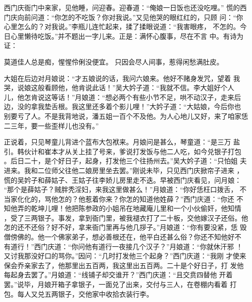 西门庆衙门中来家，见他睡，问迎春。迎春道：“俺娘一日饭也还没吃哩。”
慌的西门庆向前问道：“你怎的不吃饭？你对我说。”又见他哭的眼红红的，只顾
问：“你心里怎么的？对我说。”李瓶儿连忙起来，揉了揉眼说道：“我害眼疼，
不怎的。今日心里懒待吃饭。”并不题出一字儿来。正是：满怀心腹事，尽在不言
中。有诗为证：

莫道佳人总是痴，惺惺伶俐没便宜。
只因会尽人间事，惹得闲愁满肚皮。

大姐在后边对月娘说：“才五娘说的话，我问六娘来。他好不赌身发咒，望着
我哭，说娘这般看顾他，他肯说此话！”吴大妗子道：“我就不信。李大姐好个人
儿，他怎肯说这等话！”月娘道：“想必两个有些小节不足，哄不动汉子，走来后
边，没的拿我垫舌根。我这里还多着个影儿哩！”大妗子道：“大姑娘，今后你也
别要亏了人。不是我背地说，潘五姐一百个不及他。为人心地儿又好，来了咱家恁
二三年，要一些歪样儿也没有。”

正说着，只见琴童儿背进个蓝布大包袱来。月娘问是甚么，琴童道：“是三万
盐引。韩伙计和崔本才从关上挂了号来，爹说打发饭与他二人吃，如今兑银子打包
。后日二十，是个好日子，起身，打发他三个往扬州去。”吴大妗子道：“只怕姐
夫进来。我和二位师父往他二娘房里坐去罢。”刚说未毕，只见西门庆掀帘子进来
，慌的吴妗子和薛姑子、王姑子往李娇儿房里走不迭。早被西门庆看见，问月娘：
“那个是薛姑子？贼胖秃淫妇，来我这里做甚么！”月娘道：“你好恁枉口拨舌，
不当家化化的，骂他怎的？他惹着你来？你怎的知道他姓薛？”西门庆道：“你还
不知他弄的乾坤儿哩！他把陈参政的小姐吊在地藏庵儿里和一个小伙偷奸，他知情
，受了三两银子。事发，拿到衙门里，被我褪衣打了二十板，交他嫁汉子还俗。他
怎的还不还俗？好不好，拿来衙门里再与他几拶子。”月娘道：“你有要没紧，恁
毁僧傍佛的。他一个佛家弟子，想必善根还在，他平白还甚么俗？你还不知他好不
有道行！”西门庆道：“你问他有道行一夜接几个汉子？”月娘道：“你就休汗邪
！又讨我那没好口的骂你。”因问：“几时打发他三个起身？”西门庆道：“我刚
才使来保会乔亲家去了，他那里出五百两，我这里出五百两。二十是个好日子，打
发他每起身去罢了。”月娘道：“线铺子却交谁开？”西门庆道：“且交贲四替他
开着罢。”说毕，月娘开箱子拿银子，一面兑了出来，交付与三人，在卷棚内看着
打包。每人又兑五两银子，交他家中收拾衣装行李。

